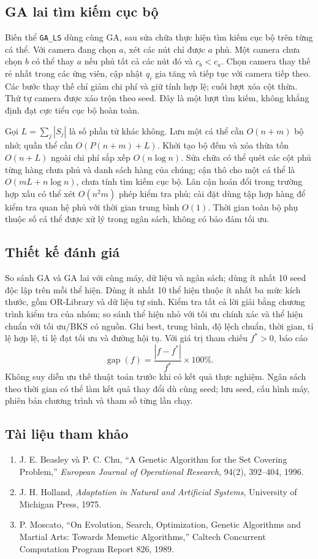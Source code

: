 \subsection{GA lai tìm kiếm cục bộ}
Biến thể \texttt{GA\_LS} dùng cùng GA, sau sửa chữa thực hiện tìm kiếm cục bộ trên từng cá thể. Với camera đang chọn $a$, xét các nút chỉ được $a$ phủ. Một camera chưa chọn $b$ có thể thay $a$ nếu phủ tất cả các nút đó và $c_b<c_a$. Chọn camera thay thế rẻ nhất trong các ứng viên, cập nhật $q_i$ gia tăng và tiếp tục với camera tiếp theo. Các bước thay thế chỉ giảm chi phí và giữ tính hợp lệ; cuối lượt xóa cột thừa. Thứ tự camera được xáo trộn theo seed. Đây là một lượt tìm kiếm, không khẳng định đạt cực tiểu cục bộ hoàn toàn.

Gọi $L=\sum_j|S_j|$ là số phần tử khác không. Lưu một cá thể cần $O(n+m)$ bộ nhớ; quần thể cần $O(P(n+m)+L)$. Khởi tạo bộ đếm và xóa thừa tốn $O(n+L)$ ngoài chi phí sắp xếp $O(n\log n)$. Sửa chữa có thể quét các cột phủ từng hàng chưa phủ và danh sách hàng của chúng; cận thô cho một cá thể là $O(mL+n\log n)$, chưa tính tìm kiếm cục bộ. Lân cận hoán đổi trong trường hợp xấu có thể xét $O(n^2m)$ phép kiểm tra phủ; cài đặt dùng tập hợp hàng để kiểm tra quan hệ phủ với thời gian trung bình $O(1)$. Thời gian toàn bộ phụ thuộc số cá thể được xử lý trong ngân sách, không có bảo đảm tối ưu.

\subsection{Thiết kế đánh giá}
So sánh GA và GA lai với cùng máy, dữ liệu và ngân sách; dùng ít nhất 10 seed độc lập trên mỗi thể hiện. Dùng ít nhất 10 thể hiện thuộc ít nhất ba mức kích thước, gồm OR-Library và dữ liệu tự sinh. Kiểm tra tất cả lời giải bằng chương trình kiểm tra của nhóm; so sánh thể hiện nhỏ với tối ưu chính xác và thể hiện chuẩn với tối ưu/BKS có nguồn. Ghi best, trung bình, độ lệch chuẩn, thời gian, tỉ lệ hợp lệ, tỉ lệ đạt tối ưu và đường hội tụ. Với giá trị tham chiếu $f^*>0$, báo cáo
\[
 \operatorname{gap}(f)=\frac{|f-f^*|}{f^*}\times 100\%.
\]
Không suy diễn ưu thế thuật toán trước khi có kết quả thực nghiệm. Ngân sách theo thời gian có thể làm kết quả thay đổi dù cùng seed; lưu seed, cấu hình máy, phiên bản chương trình và tham số từng lần chạy.

\subsection{Tài liệu tham khảo}
\begin{enumerate}
 \item J. E. Beasley và P. C. Chu, ``A Genetic Algorithm for the Set Covering Problem,'' \emph{European Journal of Operational Research}, 94(2), 392--404, 1996.
 \item J. H. Holland, \emph{Adaptation in Natural and Artificial Systems}, University of Michigan Press, 1975.
 \item P. Moscato, ``On Evolution, Search, Optimization, Genetic Algorithms and Martial Arts: Towards Memetic Algorithms,'' Caltech Concurrent Computation Program Report 826, 1989.
\end{enumerate}

